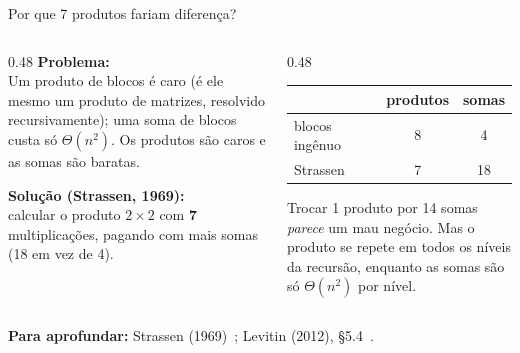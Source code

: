 \documentclass[aspectratio=169,xcolor=table]{beamer}
\newcommand{\fonte}[1]{%
  \vfill
  {\tiny\color{gray!55!black}\textbf{Para aprofundar:} #1\par}%
}
\begin{document}
\begin{frame}{Por que 7 produtos fariam diferença?}
  \begin{columns}[T]
    \begin{column}{0.48\textwidth}
      \textbf{Problema:}\\
      \scriptsize Um produto de blocos é caro (é ele mesmo um produto de matrizes, resolvido
      recursivamente); uma soma de blocos custa só $\Theta(n^2)$. Os produtos são caros e as somas são baratas.
      \medskip

      \textbf{Solução (Strassen, 1969):}\\
      \scriptsize calcular o produto $2\times 2$ com \textbf{7} multiplicações,
      pagando com mais somas (18 em vez de 4).
    \end{column}
    \begin{column}{0.48\textwidth}
      \centering\scriptsize
      \begin{tabular}{lcc}
        \toprule
                       & produtos & somas \\
        \midrule
        blocos ingênuo & 8 & 4 \\
        \rowcolor{orange!15}
        Strassen       & 7 & 18 \\
        \bottomrule
      \end{tabular}
      \medskip

      Trocar 1 produto por 14 somas \emph{parece} um mau negócio.
      Mas o produto se repete em todos os níveis da recursão, enquanto as somas são
      só $\Theta(n^2)$ por nível.
    \end{column}
  \end{columns}
  \fonte{Strassen (1969)~\cite{strassen1969gaussian};
    Levitin (2012), \S 5.4~\cite{levitin2012introduction}.}
\end{frame}
\end{document}

